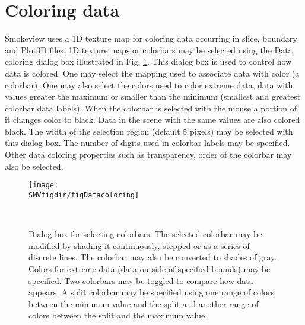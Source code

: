 \documentclass[11pt,twoside]{book}
\begin{document}
\section{Coloring data}Smokeview uses a 1D texture map for coloring data occurring in
slice, boundary and Plot3D files. 1D texture maps or colorbars may
be selected using the Data coloring dialog box illustrated in Fig. \ref{figDatacoloring}.
This dialog box is used to control how data is colored.
One may select the mapping used to associate data with color (a colorbar).
One may also select the colors used to color extreme data, data with values greater
the maximum or smaller than the minimum (smallest and greatest colorbar data labels).
When the colorbar is selected with the mouse a portion of it changes color to black.
Data in the scene with the same values are also colored black.
The width of the selection region (default 5 pixels) may be selected with this dialog box.
The number of digits used in colorbar labels may be specified.
Other data coloring properties such as transparency, order of the colorbar may also be selected.


\begin{figure}[bph]
\centerline{\texttt{[image: \\SMVfigdir/figDatacoloring]}
}\ \caption [Dialog box for selecting colorbars.] {Dialog
box for selecting colorbars.  The selected colorbar may be modified by
shading it continuously, stepped or as a series of discrete lines.  The
colorbar may also be converted to shades of gray.  Colors for
extreme data (data outside of specified bounds) may be specified. Two colorbars may be toggled
to compare how data appears.
A split colorbar may be specified using one range of colors between the minimum
value and the split and another range of colors between the split and the maximum value.}
\label{figDatacoloring}
\end{figure}
\end{document}
